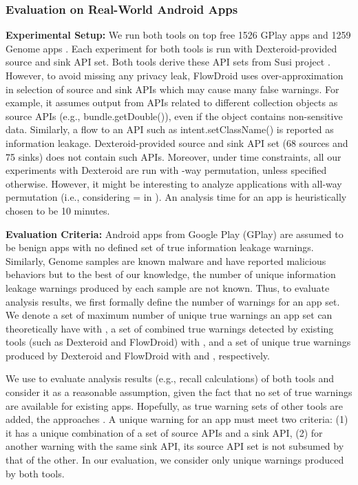 \documentclass[10pt]{elsarticle}
\begin{document}
\subsubsection{Evaluation on Real-World Android Apps} \label{evalReadWorld}

{\noindent \bf Experimental Setup:} We run both tools on top free 1526 GPlay apps and 1259 Genome apps \cite{dissectingAndroid}. Each experiment for both tools is run with Dexteroid-provided source and sink API set. Both tools derive these API sets from Susi project \cite{Susi}. However, to avoid missing any privacy leak, FlowDroid uses over-approximation in selection of source and sink APIs which may cause many false warnings. For example, it assumes output from APIs related to different collection objects as source APIs (e.g., {\ttfamily bundle.getDouble()}), even if the object contains non-sensitive data. Similarly, a flow to an API such as {\ttfamily intent.setClassName()} is reported as information leakage. Dexteroid-provided source and sink API set (68 sources and 75 sinks) does not contain such APIs. Moreover, under time constraints, all our experiments with Dexteroid are run with -way permutation, unless specified otherwise. However, it might be interesting to analyze applications with all-way permutation (i.e., considering = in ). An analysis time for an app is heuristically chosen to be 10 minutes. 


{\noindent \bf Evaluation Criteria:} Android apps from Google Play (GPlay) are assumed to be benign apps with no defined set of true information leakage warnings. Similarly, Genome samples are known malware and have reported malicious behaviors \cite{dissectingAndroid} but to the best of our knowledge, the number of unique information leakage warnings produced by each sample are not known. Thus, to evaluate analysis results, we first formally define the number of warnings for an app set. We denote a set of maximum number of unique true warnings an app set can theoretically have with , a set of combined true warnings detected by existing tools (such as Dexteroid and FlowDroid) with , and a set of unique true warnings produced by Dexteroid and FlowDroid with  and , respectively. 
    


We use  to evaluate analysis results (e.g., recall calculations) of both tools and consider it as a reasonable assumption, given the fact that no set of true warnings are available for existing apps. Hopefully, as true warning sets of other tools are added, the  approaches . A unique warning for an app must meet two criteria: (1) it has a unique combination of a set of source APIs and a sink API, (2) for another warning with the same sink API, its source API set is not subsumed by that of the other. In our evaluation, we consider only unique warnings produced by both tools.
\end{document}
